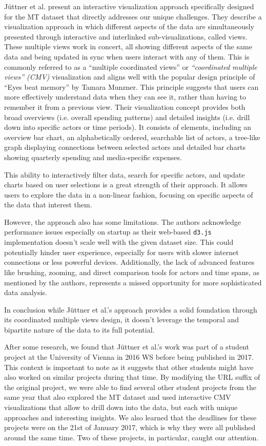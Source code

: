 \documentclass{vgtc}
\begin{document}
Jüttner et al. \cite{Jttner2017MediaTI} present an interactive visualization approach specifically designed for the MT dataset that directly addresses our unique challenges.
They describe a visualization approach in which different aspects of the data are simultaneously presented through interactive and interlinked sub-visualizations, called views. These multiple views work in concert, all showing different aspects of the same data and being updated in sync when users interact with any of them. This is commonly referred to as a ``multiple coordinated views'' or \textit{``coordinated multiple views'' (CMV)} \cite{roberts2007state} visualization and aligns well with the popular design principle of ``Eyes beat memory'' by Tamara Munzner. This principle suggests that users can more effectively understand data when they can see it, rather than having to remember it from a previous view. Their visualization concept provides both broad overviews (i.e. overall spending patterns) and detailed insights (i.e. drill down into specific actors or time periods). It consists of elements, including an overview bar chart, an alphabetically ordered, searchable list of actors, a tree-like graph displaying connections between selected actors and detailed bar charts showing quarterly spending and media-specific expenses.

This ability to interactively filter data, search for specific actors, and update charts based on user selections is a great strength of their approach. It allows users to explore the data in a non-linear fashion, focusing on specific aspects of the data that interest them.

However, the approach also has some limitations. The authors acknowledge performance issues especially on startup as their web-based \texttt{d3.js} implementation doesn't scale well with the given dataset size. This could potentially hinder user experience, especially for users with slower internet connections or less powerful devices. Additionally, the lack of advanced features like brushing, zooming, and direct comparison tools for actors and time spans, as mentioned by the authors, represents a missed opportunity for more sophisticated data analysis.

In conclusion while Jüttner et al.'s approach provides a solid foundation through its coordinated multiple views design, it doesn't leverage the temporal and bipartite nature of the data to its full potential.

After some research, we found that Jüttner et al.'s work was part of a student project at the University of Vienna in 2016 WS \cite{univie10} before being published in 2017. This context is important to note as it suggests that other students might have also worked on similar projects during that time. By modifying the URL suffix of the original project, we were able to find several other student projects from the same year that also explored the MT dataset and used interactive CMV visualizations that allow to drill down into the data, but each with unique approaches and interesting insights. We also learned that the deadlines for these projects were on the 21st of January 2017, which is why they were all published around the same time. Two of these projects, in particular, caught our attention.
\end{document}
